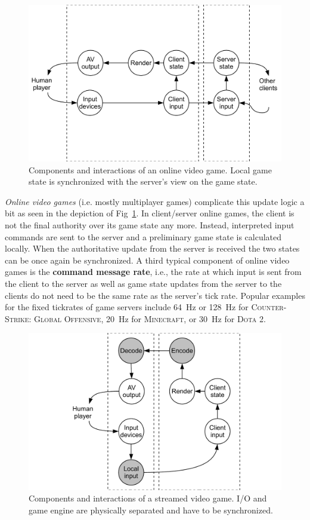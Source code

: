 \begin{figure}
  \centering
  \includegraphics[width=0.8\columnwidth]{../models/component_interaction-online.pdf}
  \caption{Components and interactions of an online video game. Local game state is synchronized with the server's view on the game state.}
  \label{fig:component-model-online}
\end{figure}

\textit{Online video games} (i.e. mostly multiplayer games) complicate this update logic a bit as seen in the depiction of Fig~\ref{fig:component-model-online}. In client/server online games, the client is not the final authority over its game state any more. Instead, interpreted input commands are sent to the server and a preliminary game state is calculated locally. When the authoritative update from the server is received the two states can be once again be synchronized. 
A third typical component of online video games is the \textbf{command message rate}, i.e., the rate at which input is sent from the client to the server as well as game state updates from the server to the clients do not need to be the same rate as the server's tick rate. Popular examples for the fixed tickrates of game servers include \SI{64}{\hertz} or \SI{128}{\hertz} for \textsc{Counter-Strike: Global Offensive}, \SI{20}{\hertz} for \textsc{Minecraft}, or \SI{30}{\hertz} for \textsc{Dota 2}.

\begin{figure}
  \centering
  \includegraphics[width=0.8\columnwidth]{../models/component_interaction-cloud.pdf}
  \caption{Components and interactions of a streamed video game. I/O and game engine are physically separated and have to be synchronized.}
  \label{fig:component-model-cloud}
\end{figure}


